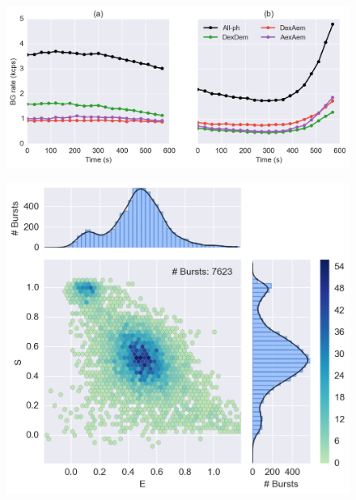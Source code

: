 \begin{figure}
\begin{center}
\includegraphics[width=\doublefig]{"figures/background_timetrace/background_timetrace"}
\caption[]{}
\end{center}
\end{figure}





\begin{figure}
\begin{center}
\includegraphics[width=\singlefig]{"figures/alex_jointplot/alex_jointplot"}
\caption[]{}
\end{center}
\end{figure}

